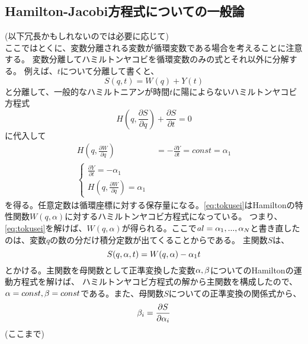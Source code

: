 \documentclass{jsarticle}
\newcommand{\pder}[2][]{\frac{\partial#1}{\partial#2}}
\newcommand{\beq}{\begin{equation}}
\newcommand{\eeq}{\end{equation}}
\begin{document}
\subsection{Hamilton-Jacobi方程式についての一般論}
(以下冗長かもしれないのでは必要に応じて)\\
ここではとくに、変数分離される変数が循環変数である場合を考えることに注意する。
変数分離してハミルトンヤコビを循環変数のみの式とそれ以外に分解する。
例えば、$t$について分離して書くと、
\beq
S(q, t) = W(q) + Y(t)
\eeq
と分離して、一般的なハミルトニアンが時間$t$に陽によらないハミルトンヤコビ方程式
\beq
    H(q,\pder[S]{q}) + \pder[S]{t} = 0
\eeq
に代入して
\begin{align}
    H(q, \pder[W]{q}) &= - \pder[Y]{t} = const =\alpha_1\\
    \left\{
\begin{array}{l}
    \pder[Y]{t} = -\alpha_1\\
    H(q, \pder[W]{q}) = \alpha_1\label{eq:tokusei}
\end{array}
\right.
\end{align}
を得る。任意定数は循環座標に対する保存量になる。\eqref{eq:tokusei}はHamiltonの特性関数$W(q,\alpha)$に対するハミルトンヤコビ方程式になっている。
つまり、\eqref{eq:tokusei}を解けば、$W(q,\alpha)$が得られる。ここで$al = {\alpha_1, ... ,\alpha_N}$と書き直したのは、変数$q$の数の分だけ積分定数が出てくることからである。
主関数$S$は、
\beq
S(q, \alpha, t) = W(q, \al) - \al_1 t
\eeq
とかける。主関数を母関数として正準変換した変数$\alpha, \beta$についてのHamiltonの運動方程式を解けば、
ハミルトンヤコビ方程式の解から主関数を構成したので、$\alpha = const, \beta = const$である。また、母関数$S$についての正準変換の関係式から、
\beq
 \be_i = \pder[S]{\al_i}
\eeq
(ここまで)
\end{document}
